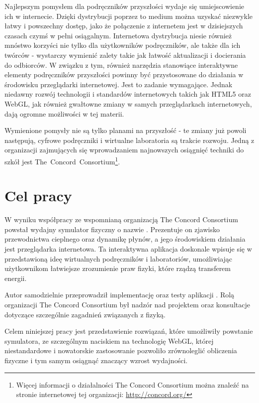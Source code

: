 Najlepszym pomysłem dla podręczników przyszłości wydaje się umiejscowienie ich w
internecie. Dzięki dystrybucji poprzez to medium można uzyskać niezwykle łatwy i
powszechny dostęp, jako że połączenie z internetem jest w dzisiejszych czasach
czymś w pełni osiągalnym. Internetowa dystrybucja niesie również mnóstwo
korzyści nie tylko dla użytkowników podręczników, ale także dla ich twórców -
wystarczy wymienić zalety takie jak łatwość aktualizacji i docierania do
odbiorców. W związku z tym, również narzędzia stanowiące interaktywne elementy
podręczników przyszłości powinny być przystosowane do działania w środowisku
przeglądarki internetowej. Jest to zadanie wymagające. Jednak niedawny rozwój
technologii i standardów internetowych takich jak HTML5 oraz WebGL, jak również
gwałtowne zmiany w samych przeglądarkach internetowych, dają ogromne możliwości
w tej materii.

Wymienione pomysły nie są tylko planami na przyszłość - te zmiany już powoli
następują, cyfrowe podręczniki i wirtualne laboratoria są trakcie rozwoju.
Jedną z organizacji zajmujących się wprowadzaniem najnowszych osiągnięć
techniki do szkół jest \mbox{The Concord Consortium}\footnote{Więcej
informacji o działalności The Concord Consortium można znaleźć na stronie
internetowej tej organizacji: \url{http://concord.org/}}.

\section{Cel pracy}
\label{sec:celPracy}

W wyniku współpracy ze wspomnianą organizacją The Concord Consortium powstał
wydajny symulator fizyczny o nazwie \en. Prezentuje on zjawisko przewodnictwa
cieplnego oraz dynamikę płynów, a jego środowiskiem działania jest przeglądarka
internetowa. Ta interaktywna aplikacja doskonale wpisuje się w przedstawioną
ideę wirtualnych podręczników i laboratoriów, umożliwiając użytkownikom
łatwiejsze zrozumienie praw fizyki, które rządzą transferem energii. 

Autor samodzielnie przeprowadził implementację oraz testy aplikacji \en. Rolą
organizacji The Concord Consortium był nadzór nad projektem oraz konsultacje
dotyczące szczególnie zagadnień związanych z fizyką.

Celem niniejszej pracy jest przedstawienie rozwiązań, które umożliwiły powstanie
symulatora, ze szczególnym naciskiem na technologię WebGL, której niestandardowe
i nowatorskie zastosowanie pozwoliło zrównoleglić obliczenia fizyczne i tym
samym osiągnąć znaczący wzrost wydajności. 


